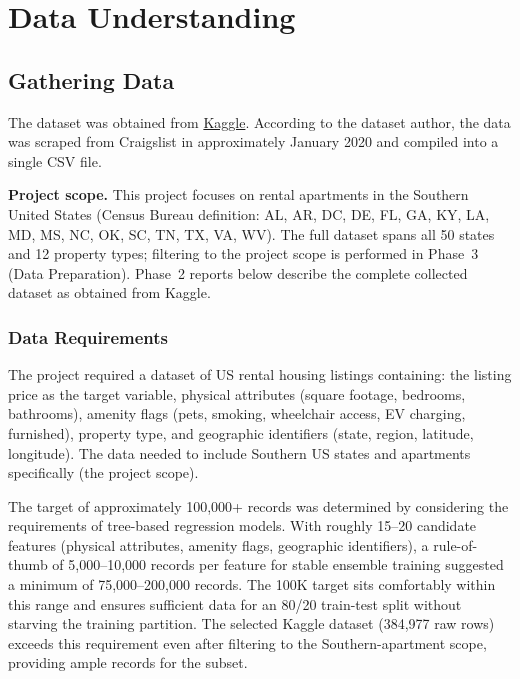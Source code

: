

\section{Data Understanding}



\subsection{Gathering Data}
\label{subsec:Gathering Data}
\noindent
The dataset was obtained from \href{https://www.kaggle.com/datasets/austinreese/usa-housing-listings}{Kaggle}. According to the dataset author, the data was scraped from Craigslist in approximately January 2020 and compiled into a single CSV file.

\vspace{6pt}
\noindent
\textbf{Project scope.} This project focuses on rental apartments in the Southern United States (Census Bureau definition: AL, AR, DC, DE, FL, GA, KY, LA, MD, MS, NC, OK, SC, TN, TX, VA, WV). The full dataset spans all 50 states and 12 property types; filtering to the project scope is performed in Phase~3 (Data Preparation). Phase~2 reports below describe the complete collected dataset as obtained from Kaggle.

\subsubsection{Data Requirements}
\noindent
The project required a dataset of US rental housing listings containing: the listing price as the target variable, physical attributes (square footage, bedrooms, bathrooms), amenity flags (pets, smoking, wheelchair access, EV charging, furnished), property type, and geographic identifiers (state, region, latitude, longitude). The data needed to include Southern US states and apartments specifically (the project scope).

The target of approximately 100,000+ records was determined by considering the requirements of tree-based regression models. With roughly 15--20 candidate features (physical attributes, amenity flags, geographic identifiers), a rule-of-thumb of 5,000--10,000 records per feature for stable ensemble training suggested a minimum of 75,000--200,000 records. The 100K target sits comfortably within this range and ensures sufficient data for an 80/20 train-test split without starving the training partition. The selected Kaggle dataset (384,977 raw rows) exceeds this requirement even after filtering to the Southern-apartment scope, providing ample records for the subset.

